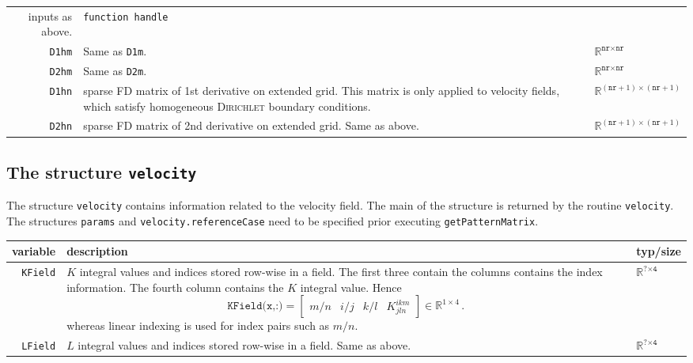 \begin{center}
\begin{tabularx}{\textwidth}{rXl}
	inputs as above.  & \texttt{function handle}\\
	\texttt{D1hm} & Same as \texttt{D1m}. & $\mathbb{R}^{\texttt{nr}\times\texttt{nr}}$\\
	\texttt{D2hm} & Same as \texttt{D2m}. & $\mathbb{R}^{\texttt{nr}\times\texttt{nr}}$\\
	\texttt{D1hn} & sparse FD matrix of 1st derivative on extended grid. This matrix is only applied to 
	velocity fields, which satisfy homogeneous \textsc{Dirichlet} boundary conditions.  & 
								$\mathbb{R}^{\left(\texttt{nr}+1\right)\times\left(\texttt{nr}+1\right)}$\\
	\texttt{D2hn} & sparse FD matrix of 2nd derivative on extended grid. Same as above. & 
								$\mathbb{R}^{\left(\texttt{nr}+1\right)\times\left(\texttt{nr}+1\right)}$
\end{tabularx}
\end{center}
\subsection{The structure \texttt{velocity}}
The structure \texttt{velocity} contains information related to the velocity field. The main of the structure is returned by the routine \texttt{velocity}. The structures \texttt{params} and 
\texttt{velocity.referenceCase} 
need to be specified prior executing \texttt{getPatternMatrix}.
\begin{center}
\begin{tabularx}{\textwidth}{rXl}
	variable & description & typ/size\\\hline
	\texttt{KField} & $K$ integral values and indices stored row-wise in a field. The first three contain the columns contains the index information. The fourth column contains the $K$ integral value. Hence
	\begin{equation*}
		\texttt{KField(x,:)}=
		\begin{bmatrix}
			m/n & i/j & k/l & K^{ikm}_{jln}
		\end{bmatrix}\in\mathbb{R}^{1\times4}\,.
	\end{equation*}
	whereas linear indexing is used for index pairs such as $m/n$.
  & $\mathbb{R}^{\texttt{?}\times\texttt{4}}$\\
	\texttt{LField} & $L$ integral values and indices stored row-wise in a field. Same as above. & 
	$\mathbb{R}^{\texttt{?}\times\texttt{4}}$
\end{tabularx}
\end{center}

